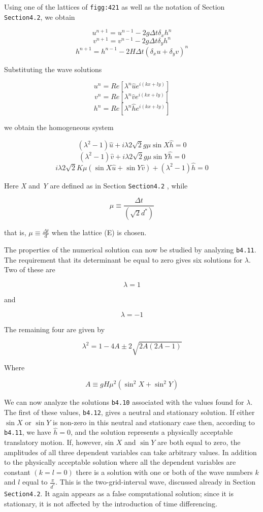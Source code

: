 Using one of the lattices of \texttt{figg:421} as well as the notation
of Section \texttt{Section4.2}, we obtain

{\[u^{n+1} = u^{n-1} -2 g \Delta t \delta_x h^n\]\[v^{n+1} = v^{n-1} -2 g \Delta t \delta_y h^n\]\[h^{n+1} = h^{n-1} -2 H \Delta t ( \delta_x u + \delta_y v)^n\]}

Substituting the wave solutions

{\[u^n = Re \left[ \lambda^n \widehat{u} e^{i(kx+ly)} \right]\]\[v^n = Re \left[ \lambda^n \widehat{v} e^{i(kx+ly)} \right]\]\[h^n = Re \left[ \lambda^n \widehat{h} e^{i(kx+ly)} \right]\]}

we obtain the homogeneous system

{\[\left( \lambda^{2} - 1 \right)\widehat{u} + i\lambda 2\sqrt{2}g\mu \sin{X}\widehat{h} = 0\]\[\left( \lambda^{2} - 1 \right)\widehat{v} + i\lambda 2\sqrt{2}g\mu \sin{Y}\widehat{h} = 0\]\[i\lambda 2\sqrt{2}K\mu \left( \sin{X}\widehat{u} + \sin{Y}\widehat{v} \right) + \left( \lambda^{2} - 1 \right)\widehat{h} = 0\]}

Here \emph{X} and \emph{Y} are defined as in Section \texttt{Section4.2}
, while

\[\mu \equiv \frac{\Delta t}{\left( \sqrt{2}d^{*} \right)}\]

that is, \(\mu \equiv \frac{\Delta t}{d}\) when the lattice (E) is
chosen.

The properties of the numerical solution can now be studied by analyzing
\texttt{b4.11}. The requirement that its determinant be equal to zero
gives six solutions for \(\lambda\). Two of these are

{\[\lambda = 1\]}

and

{\[\lambda = - 1\]}

The remaining four are given by

{\[\lambda^{2} = 1 - 4A \pm 2\sqrt{2A( 2A - 1 )}\]}

Where

\[A \equiv gH\mu^{2}\left( \sin^{2}X + \sin^{2}Y \right)\]

We can now analyze the solutions \texttt{b4.10} associated with the
values found for \(\lambda\). The first of these values, \texttt{b4.12},
gives a neutral and stationary solution. If either \(\sin{X}\) or
\(\sin{Y}\) is non-zero in this neutral and stationary case then,
according to \texttt{b4.11}, we have \(\widehat{h} = 0\), and the
solution represents a physically acceptable translatory motion. If,
however, sin \(X\) and \(\sin{Y}\) are both equal to zero, the
amplitudes of all three dependent variables can take arbitrary values.
In addition to the physically acceptable solution where all the
dependent variables are constant \(\left( k = l = 0 \right)\) there is a
solution with one or both of the wave numbers \(k\) and \(l\) equal to
\(\frac{\pi}{d^{*}}\). This is the two-grid-interval wave, discussed
already in Section \texttt{Section4.2}. It again appears as a false
computational solution; since it is stationary, it is not affected by
the introduction of time differencing.


